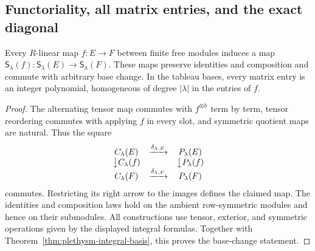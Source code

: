 \subsection{Functoriality, all matrix entries, and the exact diagonal}

\begin{proposition}
\label{prop:plethysm-functorial}
Every $R$-linear map $f:E\to F$ between finite free modules induces
a map $\mathsf S_\lambda(f):\mathsf S_\lambda(E)\to
\mathsf S_\lambda(F)$. These maps preserve identities and
composition and commute with arbitrary base change. In the tableau
bases, every matrix entry is an integer polynomial, homogeneous of
degree $|\lambda|$ in the entries of $f$.
\end{proposition}

\begin{proof}
The alternating tensor map commutes with $f^{\otimes h}$ term by
term, tensor reordering commutes with applying $f$ in every slot,
and symmetric quotient maps are natural. Thus the square
\[
 \begin{array}{ccc}
 C_\lambda(E)&\xrightarrow{\delta_{\lambda,E}}&P_\lambda(E)\\
 \big\downarrow C_\lambda(f)&&\big\downarrow P_\lambda(f)\\
 C_\lambda(F)&\xrightarrow{\delta_{\lambda,F}}&P_\lambda(F)
 \end{array}
\]
commutes. Restricting its right arrow to the images defines the
claimed map. The identities and composition laws hold on the
ambient row-symmetric modules and hence on their submodules.
All constructions use tensor, exterior, and symmetric operations
given by the displayed integral formulas. Together with
Theorem~\ref{thm:plethysm-integral-basis}, this proves the base-change
statement.


\end{proof}
